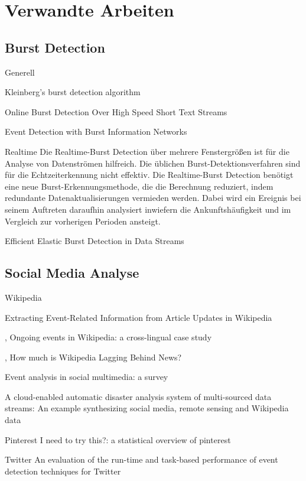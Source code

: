 \section{Verwandte Arbeiten}
\subsection{Burst Detection}
Generell

Kleinberg’s burst detection algorithm

Online Burst Detection Over High Speed Short Text Streams

Event Detection with Burst Information Networks

Realtime
Die Realtime-Burst Detection über mehrere Fenstergrößen ist für die Analyse von Datenströmen hilfreich. Die üblichen Burst-Detektionsverfahren sind für die Echtzeiterkennung nicht effektiv. Die Realtime-Burst Detection benötigt eine neue Burst-Erkennungsmethode, die die Berechnung reduziert, indem redundante Datenaktualisierungen vermieden werden. Dabei wird ein Ereignis bei seinem Auftreten daraufhin analysiert inwiefern die Ankunftshäufigkeit und im Vergleich zur vorherigen Perioden ansteigt.

Efficient Elastic Burst Detection in Data Streams 



\subsection{Social Media Analyse}



Wikipedia

Extracting Event-Related Information from
Article Updates in Wikipedia
\cite{10.1007978-3-642-36973-5_22}


\cite{gottschalk2017ongoing},
  Ongoing events in Wikipedia: a cross-lingual case study

\cite{fetahu2015much},
  How much is Wikipedia Lagging Behind News?

\cite{liu2016event}
  Event analysis in social multimedia: a survey

A cloud-enabled automatic disaster analysis system of multi-sourced data streams: An example synthesizing social media, remote sensing and Wikipedia data
\cite{huang2017cloud}

Pinterest
I need to try this?: a statistical overview of pinterest
\cite{gilbert2013need}

Twitter
An evaluation of the run-time and task-based performance of event detection techniques for Twitter
\cite{weiler2016evaluation}
